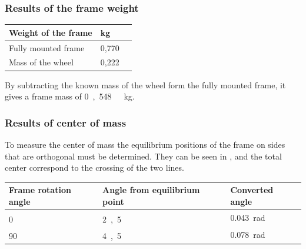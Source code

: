\subsubsection{Results of the frame weight}
\begin{table}[H]
	\begin{tabular}{|l|l|p{4.3cm}|}
		\hline%
		\textbf{Weight of the frame}       &  \textbf{kg}         \\
		\hline%
		Fully mounted frame        	  & 0,770          \\
		\hline%
		Mass of the wheel        	  & 0,222          \\
		\hline%
	\end{tabular}
\end{table}	
By subtracting the known mass of the wheel form the fully mounted frame, it gives a frame mass of \si{0,548\ kg}.

\subsubsection{Results of center of mass}
To measure the center of mass the equilibrium positions of the frame on sides that are orthogonal must be determined. They can be seen in , and the total center correspond to the crossing of the two lines.
\begin{table}[H]
	\begin{tabular}{|l|l|p{5cm}|}
		\hline%
		\textbf{Frame rotation angle}       &  \textbf{Angle from equilibrium point}       &  \textbf{Converted angle} \\
		\hline%
		\si{0^{\circ}}       & \si{2,5^{\circ}}      & \SI{0,043}{rad}     \\
		\hline%
		\si{90^{\circ}} 	 & \si{4,5^{\circ}}   & \SI{0,078}{rad}   \\
		\hline%
	\end{tabular}
\end{table}

